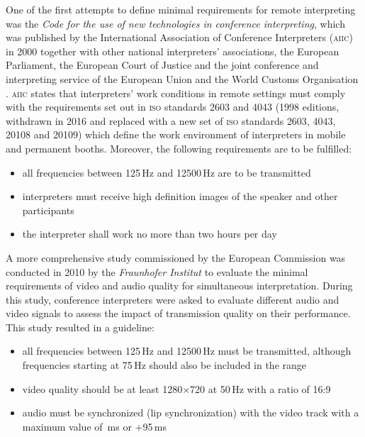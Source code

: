 \documentclass[output=paper]{langsci/langscibook}
\begin{document}
One of the first attempts to define minimal requirements for remote interpreting was the \textit{Code for the use of new technologies in conference interpreting}, which was published by the International Association of Conference Interpreters (\textsc{aiic}) in 2000 together with other national interpreters' associations, the European Parliament, the European Court of Justice and the joint conference and interpreting service of the European Union and the World Customs Organisation \citep[31]{Korak2010}. \textsc{aiic} states that interpreters’ work conditions in remote settings must comply with the requirements set out in \textsc{iso} standards \textsc{2603} and \textsc{4043} (1998 editions, withdrawn in 2016 and replaced with a new set of \textsc{iso} standards \textsc{2603}, \textsc{4043}, \textsc{20108} and \textsc{20109}) which define the work environment of interpreters in mobile and permanent booths. Moreover, the following requirements are to be fulfilled:

\begin{itemize}
\item all frequencies between 125\,Hz and 12500\,Hz are to be transmitted
\item interpreters must receive high definition images of the speaker and other participants 
\item the interpreter shall work no more than two hours per day \citep[2]{AIIC2000}
\end{itemize}

A more comprehensive study commissioned by the European Commission was conducted in 2010 by the \textit{Fraunhofer Institut} to evaluate the minimal requirements of video and audio quality for simultaneous interpretation. During this study, conference interpreters were asked to evaluate different audio and video signals to assess the impact of transmission quality on their performance. This study resulted in a guideline:

\begin{itemize}
\item all frequencies between 125\,Hz and 12500\,Hz must be transmitted, although frequencies starting at 75\,Hz should also be included in the range
\item video quality should be at least 1280$\times$720 at 50\,Hz with a ratio of 16:9
\item audio must be synchronized (lip synchronization) with the video track with a maximum value of \,ms or +95\,ms
\end{itemize}
\end{document}
